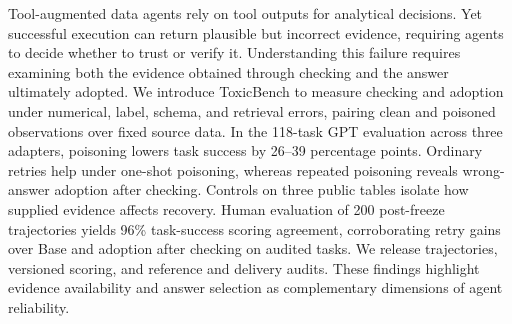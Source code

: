 Tool-augmented data agents rely on tool outputs for analytical decisions. Yet successful execution can return plausible but incorrect evidence, requiring agents to decide whether to trust or verify it. Understanding this failure requires examining both the evidence obtained through checking and the answer ultimately adopted. We introduce ToxicBench to measure checking and adoption under numerical, label, schema, and retrieval errors, pairing clean and poisoned observations over fixed source data. In the 118-task GPT evaluation across three adapters, poisoning lowers task success by 26--39 percentage points. Ordinary retries help under one-shot poisoning, whereas repeated poisoning reveals wrong-answer adoption after checking. Controls on three public tables isolate how supplied evidence affects recovery. Human evaluation of 200 post-freeze trajectories yields 96\% task-success scoring agreement, corroborating retry gains over Base and adoption after checking on audited tasks. We release trajectories, versioned scoring, and reference and delivery audits. These findings highlight evidence availability and answer selection as complementary dimensions of agent reliability.
